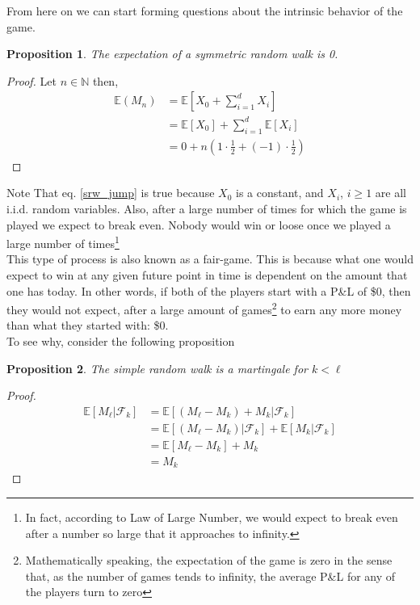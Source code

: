 \documentclass[11pt]{report}
\newtheorem{proposition}{Proposition}[chapter]
\newcommand{\salgF}{\mathscr{F}}
\begin{document}
From here on we can start forming questions about the intrinsic behavior of the game. 

\begin{proposition}\label{expectation_srw}
	The expectation of a symmetric random walk is 0.
\end{proposition}

\begin{proof}
	Let $n \in \mathbb{N}$ then,
	\begin{align}
	\mathbb{E}(M_n) &= \mathbb{E}\left[X_0 + \sum_{i=1}^d X_i\right] \nonumber \\
				    &= \mathbb{E}[X_0] + \sum_{i=1}^d \mathbb{E}\left[X_i\right] \label{srw_jump}\\
				    &= 0 + n  \left( 1 \cdot \frac{1}{2} + (-1) \cdot \frac{1}{2}\right) \nonumber
	\end{align}
\end{proof}

Note That eq. \ref{srw_jump} is true because $X_0$ is a constant, and $X_i$, $i \geq 1$ are all i.i.d. random variables. Also, after a large number of times for which the game is played we expect to break even. Nobody would win or loose once we played a large number of times\footnote{In fact, according to Law of Large Number, we would expect to break even after a number so large that it approaches to infinity.}\\

This type of process is also known as a fair-game. This is because what one would expect to win at any given future point in time is dependent on the amount that one has today. In other words, if both of the players start with a P\&L of \$0, then they would not expect, after a large amount of games\footnote{Mathematically speaking, the expectation of the game is zero in the sense that, as the number of games tends to infinity, the average P\&L for any of the players turn to zero} to earn any more money than what they started with: \$0.\\

To see why, consider the following proposition

\begin{proposition}
	The simple random walk is a martingale for $k < \ell$
\end{proposition}

\begin{proof}
	\begin{align*}
				\mathbb{E}[M_\ell|\salgF_k] &= \mathbb{E}[(M_\ell - M_k) + M_k | \salgF_k] \\
				&= \mathbb{E}[(M_\ell - M_k) | \salgF_k] + \mathbb{E}[M_k | \salgF_k] \\
				&= \mathbb{E}[M_\ell - M_k] + M_k\\
				&= M_k
	\end{align*}
\end{proof}
\end{document}
